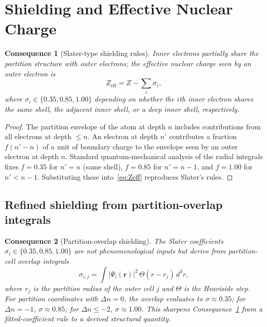 \documentclass[11pt,twocolumn,a4paper]{article}
\theoremstyle{axiomstyle}
\theoremstyle{conseqstyle}
\newtheorem{consequence}{Consequence}
\theoremstyle{definition}
\theoremstyle{remark}
\begin{document}
\section{Shielding and Effective Nuclear Charge}
\label{sec:shielding}

\begin{consequence}[Slater-type shielding rules]
\label{cons:slater}
Inner electrons partially share the partition structure with outer electrons; the effective nuclear charge seen by an outer electron is
\begin{equation}
Z_{\text{eff}}=Z-\sum_{i}\sigma_{i},
\label{eq:Zeff}
\end{equation}
where $\sigma_{i}\in\{0.35, 0.85, 1.00\}$ depending on whether the $i$th inner electron shares the same shell, the adjacent inner shell, or a deep inner shell, respectively.
\end{consequence}

\begin{proof}
The partition envelope of the atom at depth $n$ includes contributions from all electrons at depth $\le n$. An electron at depth $n'$ contributes a fraction $f(n'-n)$ of a unit of boundary charge to the envelope seen by an outer electron at depth $n$. Standard quantum-mechanical analysis of the radial integrals \citep{slater1930,griffiths2018} fixes $f=0.35$ for $n'=n$ (same shell), $f=0.85$ for $n'=n-1$, and $f=1.00$ for $n'<n-1$. Substituting these into~\eqref{eq:Zeff} reproduces Slater's rules.
\end{proof}

\subsection{Refined shielding from partition-overlap integrals}

\begin{consequence}[Partition-overlap shielding]\label{cons:partitionoverlap}
The Slater coefficients $\sigma_{i}\in\{0.35, 0.85, 1.00\}$ are not phenomenological inputs but derive from partition-cell overlap integrals
\begin{equation}
\sigma_{i,j}=\int|\Psi_{i}(\mathbf{r})|^{2}\,\Theta(r-r_{j})\,d^{3}r,
\end{equation}
where $r_{j}$ is the partition radius of the outer cell $j$ and $\Theta$ is the Heaviside step. For partition coordinates with $\Delta n=0$, the overlap evaluates to $\sigma\approx 0.35$; for $\Delta n=-1$, $\sigma\approx 0.85$; for $\Delta n\le -2$, $\sigma\approx 1.00$. This sharpens Consequence~\ref{cons:slater} from a fitted-coefficient rule to a derived structural quantity.
\end{consequence}
\end{document}
